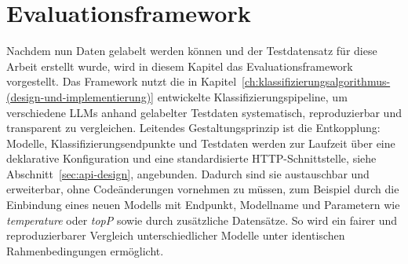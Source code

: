 
\chapter{Evaluationsframework}\label{ch:evaluationsframework}

Nachdem nun Daten gelabelt werden können und der Testdatensatz für diese Arbeit erstellt wurde, wird in diesem Kapitel das Evaluationsframework vorgestellt. Das Framework nutzt die in Kapitel~\ref{ch:klassifizierungsalgorithmus-(design-und-implementierung)} entwickelte Klassifizierungspipeline, um verschiedene \acp{LLM} anhand gelabelter Testdaten systematisch, reproduzierbar und transparent zu vergleichen. Leitendes Gestaltungsprinzip ist die Entkopplung: Modelle, Klassifizierungsendpunkte und Testdaten werden zur Laufzeit über eine deklarative Konfiguration und eine standardisierte HTTP-Schnittstelle, siehe Abschnitt~\ref{sec:api-design}, angebunden. Dadurch sind sie austauschbar und erweiterbar, ohne Codeänderungen vornehmen zu müssen, zum Beispiel durch die Einbindung eines neuen Modells mit Endpunkt, Modellname und Parametern wie \emph{temperature} oder \emph{topP} sowie durch zusätzliche Datensätze. So wird ein fairer und reproduzierbarer Vergleich unterschiedlicher Modelle unter identischen Rahmenbedingungen ermöglicht.





